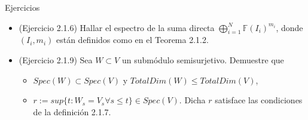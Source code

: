 \documentclass{beamer}
\newcounter{Ejercicio}
\begin{document}
\begin{frame}{Ejercicios}
    \begin{itemize}
        \item (Ejercicio 2.1.6) Hallar el espectro de la suma directa $\bigoplus_{i=1}^{N} \mathbb{F}(I_i)^{m_i}$, donde $(I_{i} , m_{i})$ están definidos como en el Teorema 2.1.2.
        \pause
        
        \item (Ejercicio 2.1.9) Sea $W \subset V$ un submódulo semisurjetivo. Demuestre que 
            \begin{itemize}
                \item $Spec(W) \subset Spec(V)$ y $TotalDim(W) \leq TotalDim(V)$,

                \item $r:=sup\{t : W_s = V_s \forall s \leq t \} \in Spec(V)$. Dicha $r$ satisface las condiciones de la definición 2.1.7.
            \end{itemize} 
    \end{itemize}

\end{frame}
\end{document}
